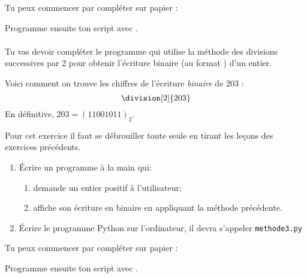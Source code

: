 \documentclass[a4paper,12pt,french]{book}
\begin{document}
Tu peux commencer par compléter sur papier :


Programme ensuite ton script avec .\\

\exo{}\\

Tu vas devoir compléter le programme  qui utilise la méthode des divisions successives par 2 pour obtenir l'écriture binaire (au format ) d'un entier.
\newpage
\begin{methode}
Voici comment on trouve les chiffres de l'écriture \textit{binaire} de 203 :
$$\division[2]{203}$$
En définitive, $203=(11001011)_2$.
\end{methode}



	Pour cet exercice il faut se \og débrouiller tout\cdot e seul\cdot e\fg{} en tirant les leçons des exercices précédents.
\begin{enumerate}[\bfseries 1.]
	\item 	\'Ecrire un programme à la main qui:
	\begin{enumerate}[--]
		\item 	demande un entier positif à l'utilisateur;
		\item 	affiche son écriture en binaire en appliquant la méthode précédente.
	\end{enumerate}
	\item 	\'Ecrire le programme Python sur l'ordinateur, il devra s'appeler \texttt{methode3.py}	
\end{enumerate}
Tu peux commencer par compléter sur papier :


Programme ensuite ton script avec .
\end{document}
